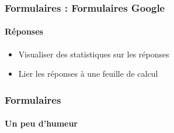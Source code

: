\documentclass[xcolor=table]{beamer}
\begin{document}
\begin{frame}
\frametitle{Formulaires : Formulaires Google}
\framesubtitle{Réponses}


\begin{itemize}
	\item Visualiser des statistiques sur les réponses
	\item Lier les réponses à une feuille de calcul 
\end{itemize}

\end{frame}


\begin{frame}
\frametitle{Formulaires}
\framesubtitle{Un peu d'humeur}
\begin{center}
\end{center}
\end{frame}


\end{document}
